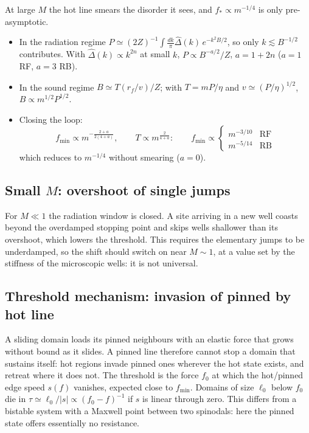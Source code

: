 \documentclass[10pt,a4paper]{article}
\begin{document}
At large $M$ the hot line smears the disorder it sees, and $f_*\propto m^{-1/4}$ is only pre-asymptotic.
\begin{itemize}
\item In the radiation regime $P\simeq(2Z)^{-1}\int\frac{dk}{\pi}\hat\Delta(k)\,e^{-k^2B/2}$, so only $k\lesssim B^{-1/2}$ contributes. With $\hat\Delta(k)\propto k^{2n}$ at small $k$, $P\propto B^{-a/2}/Z$, $a=1+2n$ ($a=1$ RF, $a=3$ RB).
\item In the sound regime $B\simeq T(r_f/v)/Z$; with $T=mP/\eta$ and $v\simeq(P/\eta)^{1/2}$, $B\propto m^{1/2}P^{1/2}$.
\item Closing the loop:
\begin{equation}
f_{\min}\propto m^{-\frac{2+a}{2(4+a)}},\qquad T\propto m^{\frac{2}{4+a}}:\qquad
f_{\min}\propto\begin{cases}m^{-3/10} & \text{RF}\\ m^{-5/14} & \text{RB}\end{cases}
\end{equation}
which reduces to $m^{-1/4}$ without smearing ($a=0$).
\end{itemize}

\subsection{Small $M$: overshoot of single jumps}
\label{sec:smallM}

For $M\ll1$ the radiation window is closed.
A site arriving in a new well coasts beyond the overdamped stopping point and skips wells shallower than its overshoot, which lowers the threshold.
This requires the elementary jumps to be underdamped, so the shift should switch on near $M\sim1$, at a value set by the stiffness of the microscopic wells: it is not universal.

\subsection{Threshold mechanism: invasion of pinned by hot line}
\label{sec:invasion}

A sliding domain loads its pinned neighbours with an elastic force that grows without bound as it slides.
A pinned line therefore cannot stop a domain that sustains itself: hot regions invade pinned ones wherever the hot state exists, and retreat where it does not.
The threshold is the force $f_0$ at which the hot/pinned edge speed $s(f)$ vanishes, expected close to $f_{\min}$.
Domains of size $\ell_0$ below $f_0$ die in $\tau\simeq\ell_0/|s|\propto(f_0-f)^{-1}$ if $s$ is linear through zero.
This differs from a bistable system with a Maxwell point between two spinodals: here the pinned state offers essentially no resistance.
\end{document}
